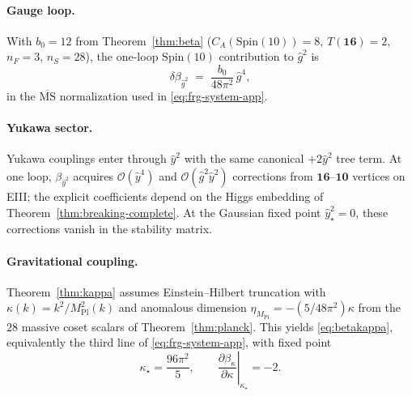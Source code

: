 \documentclass[aps,prd,onecolumn,amsmath,amssymb,nofootinbib,11pt]{revtex4-2}
\numberwithin{equation}{section}
\theoremstyle{plain}
\theoremstyle{definition}
\theoremstyle{remark}
\newcommand{\Spin}{\mathrm{Spin}}
\newcommand{\MPl}{M_{\mathrm{Pl}}}
\begin{document}
\paragraph{Gauge loop.}
With $b_0=12$ from Theorem~\ref{thm:beta} ($C_A(\Spin(10))=8$,
$T(\mathbf{16})=2$, $n_F=3$, $n_S=28$), the one-loop $\Spin(10)$ contribution
to $\hat g^2$ is
\begin{equation}\label{eq:beta-g4}
  \delta\beta_{\hat g^2}
  \;=\;
  \frac{b_0}{48\pi^2}\,\hat g^4,
\end{equation}
in the $\overline{\mathrm{MS}}$ normalization used in \eqref{eq:frg-system-app}.

\paragraph{Yukawa sector.}
Yukawa couplings enter through $\hat y^2$ with the same canonical $+2\hat y^2$
tree term. At one loop, $\beta_{\hat y^2}$ acquires $\mathcal{O}(\hat y^4)$ and
$\mathcal{O}(\hat g^2\hat y^2)$ corrections from $\mathbf{16}$--$\mathbf{10}$
vertices on EIII; the explicit coefficients depend on the Higgs embedding of
Theorem~\ref{thm:breaking-complete}. At the Gaussian fixed point
$\hat y^2_\star=0$, these corrections vanish in the stability matrix.

\paragraph{Gravitational coupling.}
Theorem~\ref{thm:kappa} assumes Einstein--Hilbert truncation with
$\kappa(k)=k^2/\MPl^2(k)$ and anomalous dimension
$\eta_{\MPl}=-(5/48\pi^2)\kappa$ from the $28$ massive coset scalars of
Theorem~\ref{thm:planck}. This yields \eqref{eq:betakappa}, equivalently the
third line of \eqref{eq:frg-system-app}, with fixed point
\begin{equation}\label{eq:kappa-star}
  \kappa_\star=\frac{96\pi^2}{5},
  \qquad
  \left.\frac{\partial\beta_\kappa}{\partial\kappa}\right|_{\kappa_\star}=-2.
\end{equation}
\end{document}
